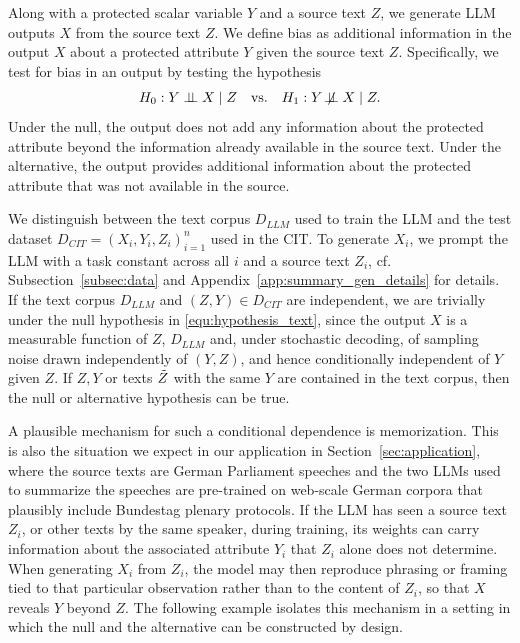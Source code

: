 \documentclass[twoside,11pt]{article}
\newcommand{\indep}{\perp \!\!\! \perp}
\newcommand{\notindep}{\not\!\perp\!\!\!\perp}
\begin{document}
Along with a protected scalar variable $Y$ and a source text $Z$, we generate LLM outputs $X$ from the source text $Z$. We define bias as additional information in the output $X$ about a protected attribute $Y$ given the source text $Z$. Specifically, we test for bias in an output by testing the hypothesis
\begin{align}\label{equ:hypothesis_text}
    H_0: Y\indep X \mid Z \quad \text{vs.} \quad H_1: Y\notindep X\mid Z.
\end{align}
Under the null, the output does not add any information about the protected attribute beyond the information already available in the source text. Under the alternative, the output provides additional information about the protected attribute that was not available in the source.

We distinguish between the text corpus $D_{LLM}$ used to train the LLM and the test dataset $D_{CIT}=(X_i, Y_i,Z_i)_{i=1}^n$ used in the CIT. 
To generate $X_i$, we prompt the LLM with a task constant across all $i$ and a source text $Z_i$, cf. Subsection~\ref{subsec:data} and Appendix~\ref{app:summary_gen_details} for details. 
If the text corpus $D_{LLM}$ and $(Z,Y)\in D_{CIT}$ are independent, we are trivially under the null hypothesis in \eqref{equ:hypothesis_text}, since the output $X$ is a measurable function of $Z$, $D_{LLM}$ and, under stochastic decoding, of sampling noise drawn independently of $(Y,Z)$, and hence conditionally independent of $Y$ given $Z$.
If $Z,Y$ or texts $\Tilde{Z}$ with the same $Y$ are contained in the text corpus, then the null or alternative hypothesis can be true. 


A plausible mechanism for such a conditional dependence is memorization. This is also the situation we expect in our application in Section~\ref{sec:application}, where the source texts are German Parliament speeches and the two LLMs used to summarize the speeches are pre-trained on web-scale German corpora that plausibly include Bundestag plenary protocols. If the LLM has seen a source text $Z_i$, or other texts by the same speaker, during training, its weights can carry information about the associated attribute $Y_i$ that $Z_i$ alone does not determine. When generating $X_i$ from $Z_i$, the model may then reproduce phrasing or framing tied to that particular observation rather than to the content of $Z_i$, so that $X$ reveals $Y$ beyond $Z$. The following example isolates this mechanism in a setting in which the null and the alternative can be constructed by design.
\end{document}
